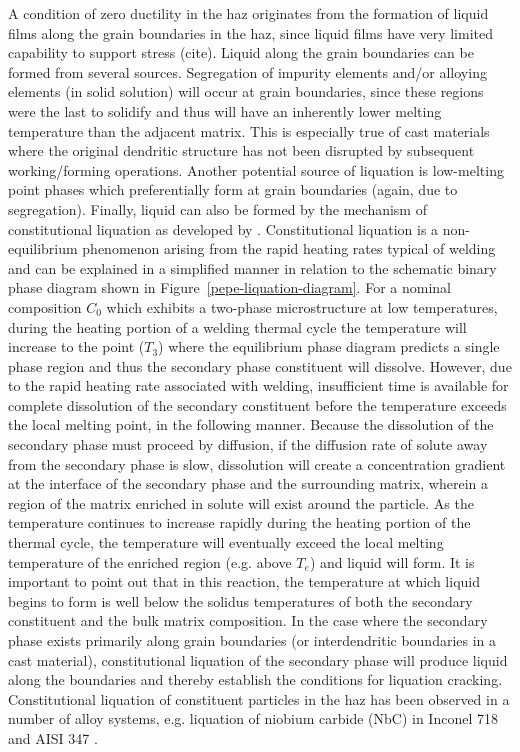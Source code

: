 A condition of zero ductility in the \gls{haz} originates from the formation of liquid films along the grain boundaries in the \gls{haz}, since liquid films have very limited capability to support stress (cite). Liquid along the grain boundaries can be formed from several sources. Segregation of impurity elements and/or alloying elements (in solid solution) will occur at grain boundaries, since these regions were the last to solidify and thus will have an inherently lower melting temperature than the adjacent matrix. This is especially true of cast materials where the original dendritic structure has not been disrupted by subsequent working/forming operations. Another potential source of liquation is low-melting point phases which preferentially form at grain boundaries (again, due to segregation). Finally, liquid can also be formed by the mechanism of constitutional liquation as developed by \citet{pepe_effects_1967}. Constitutional liquation is a non-equilibrium phenomenon arising from the rapid heating rates typical of welding and can be explained in a simplified manner in relation to the schematic binary phase diagram shown in Figure~\ref{pepe-liquation-diagram}. For a nominal composition $C_0$ which exhibits a two-phase microstructure at low temperatures, during the heating portion of a welding thermal cycle the temperature will increase to the point ($T_3$) where the equilibrium phase diagram predicts a single phase region and thus the secondary phase constituent will dissolve. However, due to the rapid heating rate associated with welding, insufficient time is available for complete dissolution of the secondary constituent before the temperature exceeds the local melting point, in the following manner. Because the dissolution of the secondary phase must proceed by diffusion, if the diffusion rate of solute away from the secondary phase is slow, dissolution will create a concentration gradient at the interface of the secondary phase and the surrounding matrix, wherein a region of the matrix enriched in solute will exist around the particle. As the temperature continues to increase rapidly during the heating portion of the thermal cycle, the temperature will eventually exceed the local melting temperature of the enriched region (e.g. above $T_e$) and liquid will form. It is important to point out that in this reaction, the temperature at which liquid begins to form is well below the solidus temperatures of both the secondary constituent and the bulk matrix composition. In the case where the secondary phase exists primarily along grain boundaries (or interdendritic boundaries in a cast material), constitutional liquation of the secondary phase will produce liquid along the boundaries and thereby establish the conditions for liquation cracking. Constitutional liquation of constituent particles in the \gls{haz} has been observed in a number of alloy systems, e.g. liquation of niobium carbide (NbC) in Inconel 718 \cite{radhakrishnan_phase_1991} and AISI 347 \cite{lee_weldability_1988}.

